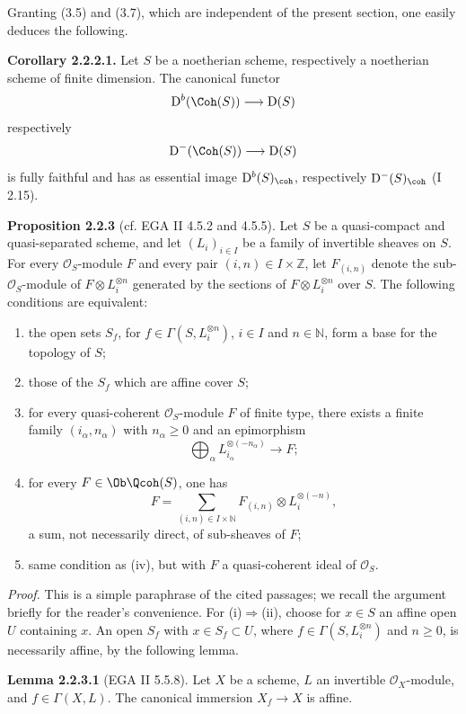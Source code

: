 Granting (3.5) and (3.7), which are independent of the present section, one easily deduces the following.

\textbf{Corollary 2.2.2.1.} Let $S$ be a noetherian scheme, respectively a noetherian scheme of finite dimension. The canonical functor
\[
\mathrm D^b(\Coh(S))\longrightarrow \mathrm D(S)
\]
respectively
\[
\mathrm D^{-}(\Coh(S))\longrightarrow \mathrm D(S)
\]
is fully faithful and has as essential image $\mathrm D^b(S)_{\coh}$, respectively $\mathrm D^{-}(S)_{\coh}$ (I 2.15).

\textbf{Proposition 2.2.3} (cf. EGA II 4.5.2 and 4.5.5). Let $S$ be a quasi-compact and quasi-separated scheme, and let $(L_i)_{i\in I}$ be a family of invertible sheaves on $S$. For every $\mathcal O_S$-module $F$ and every pair $(i,n)\in I\times\mathbb Z$, let $F_{(i,n)}$ denote the sub-$\mathcal O_S$-module of $F\otimes L_i^{\otimes n}$ generated by the sections of $F\otimes L_i^{\otimes n}$ over $S$. The following conditions are equivalent:
\begin{enumerate}[label=(\roman*)]
\item the open sets $S_f$, for $f\in\Gamma(S,L_i^{\otimes n})$, $i\in I$ and $n\in\mathbb N$, form a base for the topology of $S$;
\item those of the $S_f$ which are affine cover $S$;
\item for every quasi-coherent $\mathcal O_S$-module $F$ of finite type, there exists a finite family $(i_\alpha,n_\alpha)$ with $n_\alpha\ge0$ and an epimorphism
\[
\bigoplus_\alpha L_{i_\alpha}^{\otimes(-n_\alpha)}\longrightarrow F;
\]
\item for every $F\in\Ob\Qcoh(S)$, one has
\[
F=\sum_{(i,n)\in I\times\mathbb N}F_{(i,n)}\otimes L_i^{\otimes(-n)},
\]
a sum, not necessarily direct, of sub-sheaves of $F$;
\item same condition as (iv), but with $F$ a quasi-coherent ideal of $\mathcal O_S$.
\end{enumerate}

\emph{Proof.} This is a simple paraphrase of the cited passages; we recall the argument briefly for the reader's convenience. For (i)$\Rightarrow$(ii), choose for $x\in S$ an affine open $U$ containing $x$. An open $S_f$ with $x\in S_f\subset U$, where $f\in\Gamma(S,L_i^{\otimes n})$ and $n\ge0$, is necessarily affine, by the following lemma.

\textbf{Lemma 2.2.3.1} (EGA II 5.5.8). Let $X$ be a scheme, $L$ an invertible $\mathcal O_X$-module, and $f\in\Gamma(X,L)$. The canonical immersion $X_f\to X$ is affine.


